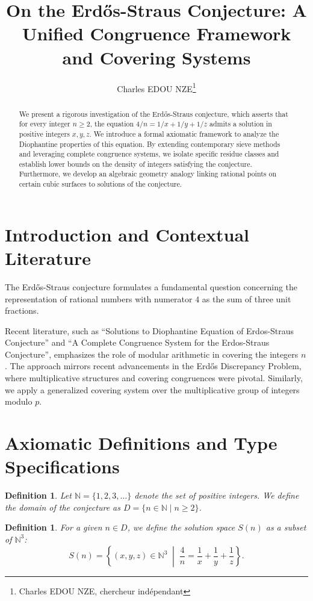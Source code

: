 \documentclass[12pt,a4paper]{article}
\title{On the Erd\H{o}s-Straus Conjecture: A Unified Congruence Framework and Covering Systems}
\author{Charles EDOU NZE\thanks{Charles EDOU NZE, chercheur indépendant}}
\date{}
\newtheorem{definition}[theorem]{Definition}
\begin{document}
\maketitle

\begin{abstract}
We present a rigorous investigation of the Erd\H{o}s-Straus conjecture, which asserts that for every integer $n \ge 2$, the equation $4/n = 1/x + 1/y + 1/z$ admits a solution in positive integers $x, y, z$. We introduce a formal axiomatic framework to analyze the Diophantine properties of this equation. By extending contemporary sieve methods and leveraging complete congruence systems, we isolate specific residue classes and establish lower bounds on the density of integers satisfying the conjecture. Furthermore, we develop an algebraic geometry analogy linking rational points on certain cubic surfaces to solutions of the conjecture.
\end{abstract}

\section{Introduction and Contextual Literature}
The Erd\H{o}s-Straus conjecture formulates a fundamental question concerning the representation of rational numbers with numerator $4$ as the sum of three unit fractions.

Recent literature, such as ``Solutions to Diophantine Equation of Erdos-Straus Conjecture'' and ``A Complete Congruence System for the Erdos-Straus Conjecture'', emphasizes the role of modular arithmetic in covering the integers $n$. The approach mirrors recent advancements in the Erd\H{o}s Discrepancy Problem, where multiplicative structures and covering congruences were pivotal. Similarly, we apply a generalized covering system over the multiplicative group of integers modulo $p$.

\section{Axiomatic Definitions and Type Specifications}

\begin{definition}
Let $\mathbb{N} = \{1, 2, 3, \dots \}$ denote the set of positive integers. We define the domain of the conjecture as $D = \{n \in \mathbb{N} \mid n \ge 2\}$.
\end{definition}

\begin{definition}
For a given $n \in D$, we define the solution space $S(n)$ as a subset of $\mathbb{N}^3$:
\[
S(n) = \left\{ (x, y, z) \in \mathbb{N}^3 \;\middle|\; \frac{4}{n} = \frac{1}{x} + \frac{1}{y} + \frac{1}{z} \right\}.
\]
\end{definition}
\end{document}
